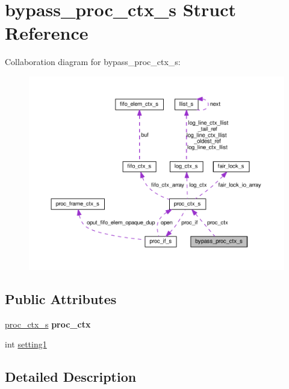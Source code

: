 \hypertarget{structbypass__proc__ctx__s}{}\section{bypass\+\_\+proc\+\_\+ctx\+\_\+s Struct Reference}
\label{structbypass__proc__ctx__s}


Collaboration diagram for bypass\+\_\+proc\+\_\+ctx\+\_\+s\+:\nopagebreak
\begin{figure}[H]
\begin{center}
\leavevmode
\includegraphics[width=350pt]{structbypass__proc__ctx__s__coll__graph}
\end{center}
\end{figure}
\subsection*{Public Attributes}
\begin{DoxyCompactItemize}
\item 
\hyperlink{structproc__ctx__s}{proc\+\_\+ctx\+\_\+s} {\bfseries proc\+\_\+ctx}\hypertarget{structbypass__proc__ctx__s_a5a1062e8893420f866d4b291a5b78fd9}{}\label{structbypass__proc__ctx__s_a5a1062e8893420f866d4b291a5b78fd9}

\item 
int \hyperlink{structbypass__proc__ctx__s_ae96fa69398b3761717955fd130e36994}{setting1}
\end{DoxyCompactItemize}


\subsection{Detailed Description}


